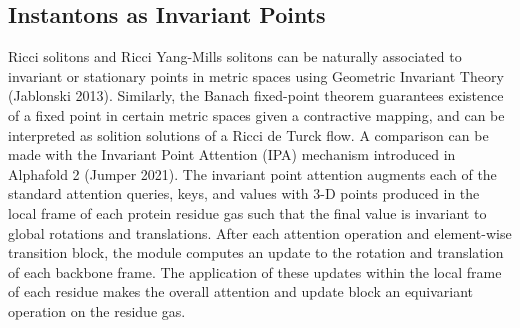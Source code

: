 \documentclass{article}
\begin{document}
    \subsection{Instantons as Invariant Points}
    Ricci solitons and Ricci Yang-Mills solitons can be naturally associated to invariant or stationary points in metric spaces using Geometric Invariant Theory (Jablonski 2013).
    Similarly, the Banach fixed-point theorem guarantees existence of a fixed point in certain metric spaces given a contractive mapping, and can be interpreted as solition solutions of a Ricci de Turck flow. A comparison can be made with the Invariant Point Attention (IPA) mechanism introduced in Alphafold 2 (Jumper 2021). The invariant point attention augments each of the standard attention queries, keys, and values with 3-D points produced in the local frame of each protein residue gas such that the final value is invariant to global rotations and translations. 
    After each attention operation and element-wise transition block, the module computes an update to the rotation and translation of each backbone frame. 
    The application of these updates within the local frame of each residue makes the overall attention and update block an equivariant operation on the residue gas.
    

    
    
\end{document}

